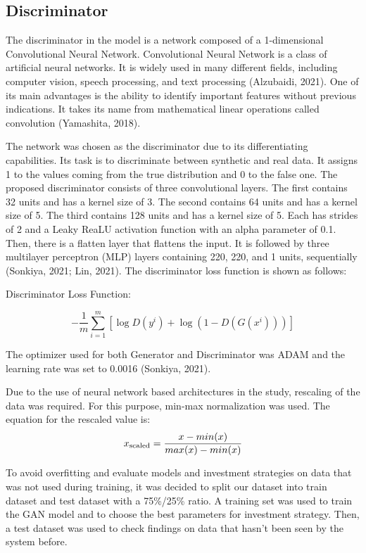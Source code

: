 \documentclass[11pt]{article} %
\begin{document}
\subsection{Discriminator}

The discriminator in the model is a network composed of a 1-dimensional Convolutional Neural Network. 
Convolutional Neural Network is a class of artificial neural networks. It is widely used in many different fields, including computer vision, speech processing, and text processing (Alzubaidi, 2021). One of its main advantages is the ability to identify important features without previous indications. It takes its name from mathematical linear operations called convolution (Yamashita, 2018).

The network was chosen as the discriminator due to its differentiating capabilities. Its task is to discriminate between synthetic and real data. It assigns 1 to the values coming from the true distribution and 0 to the false one. 
The proposed discriminator consists of three convolutional layers. The first contains 32 units and has a kernel size of 3. The second contains 64 units and has a kernel size of 5. The third contains 128 units and has a kernel size of 5. Each has strides of 2 and a Leaky ReaLU activation function with an alpha parameter of 0.1. Then, there is a flatten layer that flattens the input. It is followed by three multilayer perceptron (MLP) layers containing 220, 220, and 1 units, sequentially (Sonkiya, 2021; Lin, 2021). 
The discriminator loss function is shown as follows: 
\begin{center}  Discriminator Loss Function: \end{center}
\begin{equation}
-\frac{1}{m} \sum_{i=1}^{m}\left[\log D\left(y^{i}\right)+\log \left(1-D\left(G\left(x^{i}\right)\right)\right)\right]
\end{equation}

The optimizer used for both Generator and Discriminator was ADAM and the learning rate was set to 0.0016 (Sonkiya, 2021).

Due to the use of neural network based architectures in the study, rescaling of the data was required. For this purpose, min-max normalization was used. The equation for the rescaled value is: 
\begin{equation} x\textsubscript{scaled} = \frac{x - min(x)}{max(x) - min(x)} \end{equation}

To avoid overfitting and evaluate models and investment strategies on data that was not used during training, it was decided to split our dataset into train dataset and test dataset with a 75\%/25\% ratio. A training set was used to train the GAN model and to choose the best parameters for investment strategy. Then, a test dataset was used to check findings on data that hasn't been seen by the system before.
\end{document}
